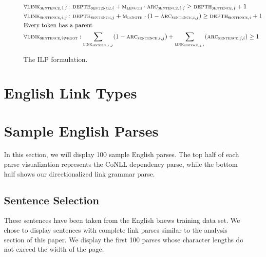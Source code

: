 \documentclass[11pt]{article}
\begin{document}
\begin{figure}[!htb]
\begin{align*}
    &\forall{\textsc{link}_{\textsc{sentence},i,j}}: \textsc{depth}_{\textsc{sentence},i} + \textsc{m}_\textsc{length}\cdot\textsc{arc}_{\textsc{sentence},i,j} \geq \textsc{depth}_{\textsc{sentence},j} + 1 &\\
    &\forall{\textsc{link}_{\textsc{sentence},i,j}}: \textsc{depth}_{\textsc{sentence},j} + \textsc{m}_\textsc{length}\cdot(1-\textsc{arc}_{\textsc{sentence},i,j}) \geq \textsc{depth}_{\textsc{sentence},i} + 1 &\\
    &\text{Every token has a parent}&\\
    &\forall{\textsc{link}_{\textsc{sentence},i \neq \textsc{root}}}: \sum_{\textsc{link}_{\textsc{sentence},i,j}} (1-\textsc{arc}_{\textsc{sentence},i,j}) + \sum_{\textsc{link}_{\textsc{sentence},j,i}}(\textsc{arc}_{\textsc{sentence},j,i}) \geq 1&\\
  \end{align*}
  \caption{\small The ILP formulation.}
\end{figure}


\clearpage

\section{English Link Types}


\section{Sample English Parses}
In this section, we will display 100 sample English parses. The top half of each parse visualization represents the CoNLL dependency parse, while the bottom half shows our directionalized link grammar parse. 

\subsection{Sentence Selection}
These sentences have been taken from the English bnews training data set. We chose to display sentences with complete link parses similar to the analysis section of this paper. We display the first 100 parses whose character lengths do not exceed the width of the page.
\end{document}
